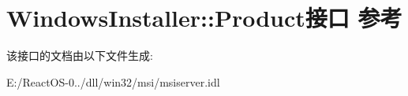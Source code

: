\hypertarget{interface_windows_installer_1_1_product}{}\section{Windows\+Installer\+:\+:Product接口 参考}
\label{interface_windows_installer_1_1_product}


该接口的文档由以下文件生成\+:\begin{DoxyCompactItemize}
\item 
E\+:/\+React\+O\+S-\/0../dll/win32/msi/msiserver.\+idl\end{DoxyCompactItemize}
